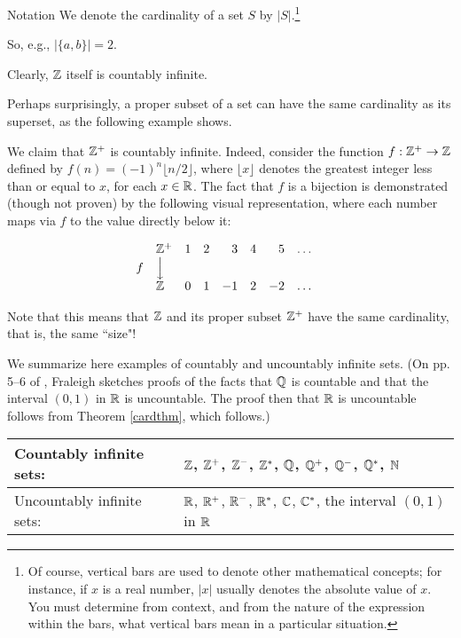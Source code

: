 \begin{df}{Notation} We denote the cardinality of a set $S$ by
$|S|$.\footnote{ Of course, vertical bars are used to denote
other mathematical concepts; for instance, if $x$ is a real
number, $|x|$ usually denotes the absolute value of $x$. You
must determine from context, and from the nature of the
expression within the bars, what vertical bars mean in a
particular situation.}\end{df} So, e.g., $|\{a,b\}|=2$.

\begin{example}{}  Clearly, $\mathbb{Z}$ itself is countably
infinite.\end{example}

Perhaps surprisingly, a proper subset of a set can have the
same cardinality as its superset, as the following example
shows.

\begin{example}{} We claim that $\mathbb{Z}^+$ is countably infinite. Indeed, consider the function $f:\mathbb{Z}^+ \to \mathbb{Z}$ defined by $f(n)=(-1)^n \lfloor n/2 \rfloor$, where $\lfloor x \rfloor$
denotes the greatest integer less than or equal to $x$, for each $x\in \mathbb{R}$. The fact that $f$ is a bijection is demonstrated (though not proven) by the following visual representation,
where each number maps via $f$ to the value directly below it:

$$
\begin{array}{llrrrrrrr}
&\mathbb{Z}^+ & 1 & 2 & 3 & 4 & 5 & \ldots&\\
f &\Big\downarrow&&&&&&&\\
&\mathbb{Z}   & 0 & 1 & -1 & 2 & -2 & \ldots&\\
\end{array}$$

Note that this means that $\mathbb{Z}$ and its proper subset $\mathbb{Z}^+$
have the same cardinality, that is, the same ``size"! \end{example}

 We summarize here examples of countably and uncountably
infinite sets. (On pp. 5--6 of \cite{F}, Fraleigh sketches proofs of the
facts that $\mathbb{Q}$ is countable and that the interval $(0,1)$
in $\mathbb{R}$ is uncountable. The proof then that $\mathbb{R}$ is
uncountable follows from Theorem \ref{cardthm}, which
follows.)

\begin{center}
\renewcommand{\arraystretch}{1.3}
\begin{tabular}{|l|l|}
\hline
Countably infinite sets: &$\mathbb{Z}$, $\mathbb{Z}^+$, $\mathbb{Z}^-$, $\mathbb{Z}^*$, $\mathbb{Q}$, $\mathbb{Q}^+$, $\mathbb{Q}^-$, $\mathbb{Q}^*$, $\mathbb{N}$\\
\hline
Uncountably infinite sets: &$\mathbb{R}$, $\mathbb{R}^+$, $\mathbb{R}^-$, $\mathbb{R}^*$, $\mathbb{C}$, $\mathbb{C}^*$,  the interval $(0,1)$ in $\mathbb{R}$                              \\
\hline
\end{tabular}
\end{center}

